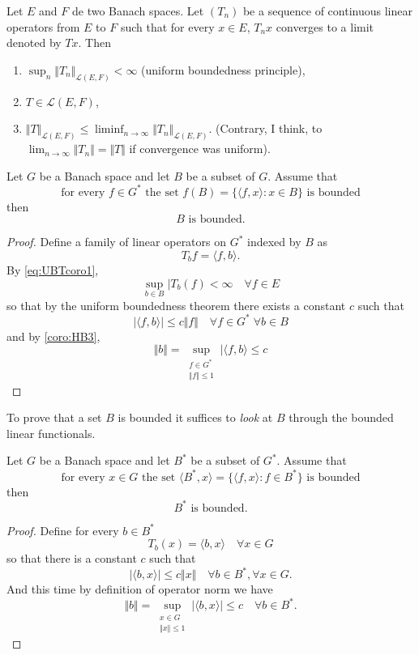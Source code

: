 \documentclass{article}
\theoremstyle{definition}
\numberwithin{equation}{section}
\begin{document}
\begin{coro}
	Let $E$ and $F$ de two Banach spaces. Let $(T_n)$ be a sequence of continuous linear operators from $E$ to $F$ such that for every $x\in E$, $T_nx$ converges to a limit denoted by $Tx$. Then
	\begin{enumerate}
		\item $\sup_n\Vert T_n\Vert_{\mathcal{L}(E,F)}<\infty$ (uniform boundedness principle),
		\item $T\in\mathcal{L}(E,F)$,
		\item $\Vert T\Vert_{\mathcal{L}(E,F)}\leq\liminf_{n\to\infty}\Vert T_n\Vert_{\mathcal{L}(E,F)}$. (Contrary, I think, to $\lim_{n\to \infty}\Vert T_n\Vert=\Vert T\Vert$ if convergence was uniform).
	\end{enumerate}
\end{coro}
\begin{coro}
	Let $G$ be a Banach space and let $B$ be a subset of $G$. Assume that
	\begin{equation}\label{eq:UBTcoro1}
		\text{for every }f\in G^*\text{ the set }f(B)=\{\langle f,x\rangle:x\in B\}\text{ is bounded}
	\end{equation}
	then
	\[B\text{ is bounded}.\]
\end{coro}
\begin{proof}
	Define a family of linear operators on $G^*$ indexed by $B$ as
	\[T_bf=\langle f,b\rangle.\]
	By \cref{eq:UBTcoro1},
	\[\sup_{b\in B}|T_b(f)<\infty\quad\forall f\in E\]
	so that by the uniform boundedness theorem there exists a constant $c$ such that
	\[|\langle f,b\rangle|\leq c\Vert f\Vert\quad\forall f\in G^*\;\forall b\in B\]
	and by \cref{coro:HB3},
	\[\Vert b\Vert=\sup_{\substack{f\in G^*\\\Vert f\Vert\leq 1}}|\langle f,b\rangle\leq c\]
\end{proof}
\begin{remark}
	To prove that a set $B$ is bounded it suffices to \textit{look} at $B$ through the bounded linear functionals.
\end{remark}
\begin{coro}
	Let $G$ be a Banach space and let $B^*$ be a subset of $G^*$. Assume that
	\begin{equation}\label{eq:UBTcoro2}
		\text{for every }x\in G\text{ the set }\langle B^*,x\rangle=\{\langle f,x\rangle:f\in B^*\}\text{ is bounded}
	\end{equation}
	then
	\[B^*\text{ is bounded}.\]
\end{coro}
\begin{proof}
	Define for every $b\in B^*$
	\[T_b(x)=\langle b,x\rangle\quad\forall x\in G\]
	so that there is a constant $c$ such that
	\[|\langle b,x\rangle|\leq c\Vert x\Vert\quad\forall b\in B^*,\forall x\in G.\]
	And this time by definition of operator norm we have
	\[\Vert b\Vert=\sup_{\substack{x\in G\\\Vert x\Vert\leq 1}}|\langle b,x\rangle|\leq c\quad\forall b\in B^*.\]
\end{proof}
\end{document}
